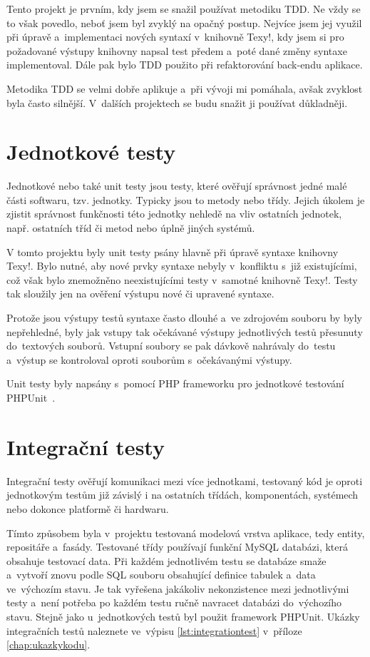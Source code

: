 \documentclass[11pt,twoside,a4paper]{book}
\begin{document}
Tento projekt je prvním, kdy jsem se snažil používat metodiku TDD. Ne vždy se to však povedlo, neboť jsem byl zvyklý na opačný postup. Nejvíce jsem jej využil při úpravě a~imple\-mentaci nových syntaxí v~knihovně Texy!, kdy jsem si pro požadované výstupy knihovny napsal test předem a~poté dané změny syntaxe imple\-mentoval. Dále pak bylo TDD použito při refaktorování back-endu aplikace.

Metodika TDD se velmi dobře aplikuje a~při vývoji mi pomáhala, avšak zvyklost byla často silnější. V~dalších projektech se budu snažit ji používat důkladněji.


\section{Jednotkové testy}
Jednotkové nebo také unit testy jsou testy, které ověřují správnost jedné malé části softwaru, tzv. jednotky. Typicky jsou to metody nebo třídy. Jejich úkolem je zjistit správnost funkčnosti této jednotky nehledě na vliv ostatních jednotek, např. ostatních tříd či metod nebo úplně jiných systémů.

V tomto projektu byly unit testy psány hlavně při úpravě syntaxe knihovny Texy!. Bylo nutné, aby nové prvky syntaxe nebyly v~konfliktu s~již existujícími, což však bylo znemožněno neexistujícími testy v~samotné knihovně Texy!. Testy tak sloužily jen na ověření výstupu nové či upravené syntaxe.

Protože jsou výstupy testů syntaxe často dlouhé a~ve zdrojovém souboru by byly nepřehledné, byly jak vstupy tak očekávané výstupy jednotlivých testů přesunuty do~textových souborů. Vstupní soubory se pak dávkově nahrávaly do~testu a~výstup se kontroloval oproti souborům s~očekávanými výstupy.

Unit testy byly napsány s~pomocí PHP frameworku pro jednotkové testování PHPUnit~\cite{phpunit}.


\section{Integrační testy}
Integrační testy ověřují komunikaci mezi více jednotkami, testovaný kód je oproti jednotkovým testům již závislý i na ostatních třídách, komponentách, systémech nebo dokonce platformě či hardwaru.

Tímto způsobem byla v~projektu testovaná modelová vrstva aplikace, tedy entity, repositáře a~fasády. Testované třídy používají funkční MySQL databázi, která obsahuje testovací data. Při každém jednotlivém testu se databáze smaže a~vytvoří znovu podle SQL souboru obsahující definice tabulek a~data ve~výchozím stavu. Je tak vyřešena jakákoliv nekonzistence mezi jednotlivými testy a~není potřeba po každém testu ručně navracet databázi do~výchozího stavu. Stejně jako u~jednotkových testů byl použit framework PHPUnit. Ukázky integračních testů naleznete ve~výpisu \ref{lst:integrationtest} v~příloze \ref{chap:ukazkykodu}.
\end{document}
